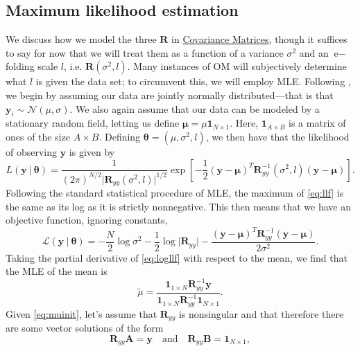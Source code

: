 \documentclass[12pt]{article}
\begin{document}
\subsection*{Maximum likelihood estimation}
\label{sec:mle}

We discuss how we model the three $\bm{R}$ in \hyperref[sec:covariance]{Covariance Matrices}, though it suffices to say for now that we will treat them as a function of a variance $\sigma^{2}$ and an $\textrm{e}-$folding scale $l$, i.e. $\bm{R}\left(\sigma^{2}, l\right)$.
Many instances of OM will subjectively determine what $l$ is given the data set; 
to circumvent this, we will employ MLE.
Following \cite{fenton1999}, we begin by assuming our data are jointly normally distributed---that is that $\bm{y}_i \sim \mathcal{N}\left(\mu, \sigma\right)$.
We also again assume that our data can be modeled by a stationary random field, letting us define $\bm{\mu} = \mu\bm{1}_{N\times 1}$.
Here, $\bm{1}_{A\times B}$ is a matrix of ones of the size $A \times B$.
Defining $\bm{\theta} = \left(\mu, \sigma^{2}, l\right)$, we then have that the likelihood of observing $\bm{y}$ is given by
\begin{equation}
    L(\bm{y} \: \lvert \: \bm{\theta}) = \frac{1}{(2\pi)^{N/2}\lvert \bm{R}_{yy}\left(\sigma^{2}, l\right) \rvert^{1/2}} \exp\left[ -\frac{1}{2} (\bm{y} - \bm{\mu})^T \bm{R}_{yy}^{-1}\left(\sigma^{2}, l\right) (\bm{y} - \bm{\mu})\right].
    \label{eq:llf}
\end{equation}
Following the standard statistical procedure of MLE, the maximum of \eqref{eq:llf} is the same as its log as it is strictly nonnegative. 
This then means that we have an objective function, ignoring constants,
\begin{equation}
    \mathcal{L}(\bm{y} \: \lvert \: \bm{\theta}) = -\frac{N}{2}\log\sigma^2 - \frac{1}{2}\log\lvert\bm{R}_{yy}\rvert - \frac{(\bm{y} - \bm{\mu})^T \bm{R}_{yy}^{-1} (\bm{y} - \bm{\mu})}{2\sigma^2}.
    \label{eq:logllf}
\end{equation}
Taking the partial derivative of \eqref{eq:logllf} with respect to the mean, we find that the MLE of the mean is
\begin{equation}
    \tilde{\mu} = \frac{\bm{1}_{1\times N}\bm{R}_{yy}^{-1}\bm{y}}{\bm{1}_{1\times N}\bm{R}_{yy}^{-1}\bm{1}_{N\times 1}}.
    \label{eq:muinit}
\end{equation}
Given \eqref{eq:muinit}, let's assume that $\bm{R}_{yy}$ is nonsingular and that therefore there are some vector solutions of the form 
\begin{equation}
    \bm{R}_{yy}\bm{A} = \bm{y} \quad \text{and} \quad \bm{R}_{yy}\bm{B} = \bm{1}_{N\times 1},
    \label{eq:abs}
\end{equation}
\end{document}
